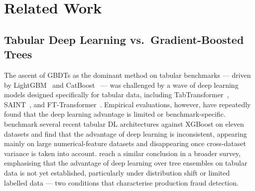 \documentclass[a4paper,fleqn]{cas-sc}
\begin{document}

\section{Related Work}
\label{sec:related}

\subsection{Tabular Deep Learning vs.\ Gradient-Boosted Trees}
\label{sec:rw_tabular}

The ascent of GBDTs as the dominant method on tabular benchmarks --- driven by
LightGBM~\citep{ke2017lightgbm} and CatBoost~\citep{prokhorenkova2018catboost}
--- was challenged by a wave of deep learning models designed specifically for
tabular data, including TabTransformer~\citep{huang2020tabtransformer},
SAINT~\citep{somepalli2021saint}, and FT-Transformer~\citep{gorishniy2021revisiting}.
Empirical evaluations, however, have repeatedly found that the deep
learning advantage is limited or benchmark-specific.
\citet{shwartzziv2022tabular} benchmark several recent tabular DL architectures
against XGBoost on eleven datasets and find that the advantage of deep
learning is inconsistent, appearing mainly on large numerical-feature datasets
and disappearing once cross-dataset variance is taken into account.
\citet{borisov2022deep} reach a similar conclusion in a broader survey,
emphasising that the advantage of deep learning over tree ensembles on
tabular data is not yet established, particularly under distribution shift or
limited labelled data --- two conditions that characterise production fraud
detection.
\end{document}

